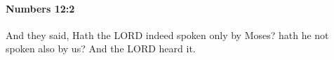 
		\paragraph{Numbers 12:2} %
			\label{NUMBERS-12-2}

			And they said, Hath the LORD indeed spoken only by Moses? hath he not spoken also by us? And the LORD heard it.


